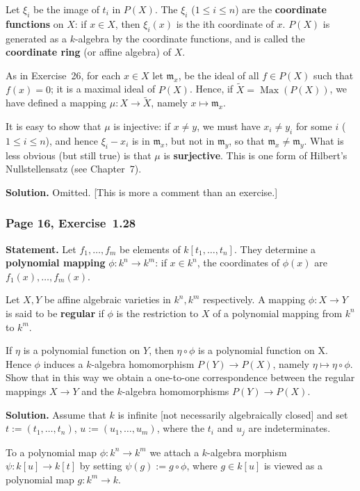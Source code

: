 \documentclass[12pt,letterpaper]{article}%
\newcommand{\oo}{\operatorname}\newcommand{\ooo}{\operatorname*}
\newcommand{\mf}{\mathfrak}
\newcommand{\mmm}{\mf m}
\newcommand{\nn}{\noindent}
\begin{document}
Let $\xi_i$ be the image of $t_i$ in $P(X)$. The $\xi_i$ ($1\le i\le n$) are the \textbf{coordinate functions} on $X$: if $x\in X$, then $\xi_i(x)$ is the ith coordinate of $x$. $P(X)$ is generated as a $k$-algebra by the coordinate functions, and is called the \textbf{coordinate ring} (or affine algebra) of $X$.

As in Exercise~26, for each $x\in X$ let $\mmm_x$, be the ideal of all $f\in P(X)$ such that $f(x)=0$; it is a maximal ideal of $P(X)$. Hence, if $\widetilde X=\oo{Max}(P(X))$, we have defined a mapping $\mu:X\to\widetilde X$, namely $x\mapsto\mmm_x$.

It is easy to show that $\mu$ is injective: if $x\ne y$, we must have $x_i\ne y_i$ for some $i$ ($1\le i\le n$), and hence $\xi_i-x_i$ is in $\mmm_x$, but not in $\mmm_y$, so that $\mmm_x\ne\mmm_y$. What is less obvious (but still true) is that $\mu$ is \textbf{surjective}. This is one form of Hilbert's Nullstellensatz (see Chapter~7).

\nn\textbf{Solution.} Omitted. [This is more a comment than an exercise.]

\subsubsection{Page 16, Exercise~1.28}%

\textbf{Statement.} Let $f_1,\ldots,f_m$ be elements of $k[t_1,\ldots,t_n]$. They determine a \textbf{polynomial mapping} $\phi:k^n\to k^m$: if $x\in k^n$, the coordinates of $\phi(x)$ are $f_1(x),\ldots,f_m(x)$.

Let $X,Y$ be affine algebraic varieties in $k^n,k^m$ respectively. A mapping $\phi:X\to Y$ is said to be \textbf{regular} if $\phi$ is the restriction to $X$ of a polynomial mapping from $k^n$ to $k^m$.

If $\eta$ is a polynomial function on $Y$, then $\eta\circ\phi$ is a polynomial function on X. Hence $\phi$ induces a $k$-algebra homomorphism $P(Y)\to P(X)$, namely $\eta\mapsto\eta\circ\phi$. Show that in this way we obtain a one-to-one correspondence between the regular mappings $X\to Y$ and the $k$-algebra homomorphisms $P(Y)\to P(X)$.

\nn\textbf{Solution.} Assume that $k$ is infinite [not necessarily algebraically closed] and set $t:=(t_1,\dots,t_n)$, $u:=(u_1,\dots,u_m)$, where the $t_i$ and $u_j$ are indeterminates. 

To a polynomial map $\phi:k^n\to k^m$ we attach a $k$-algebra morphism $\psi:k[u]\to k[t]$ by setting $\psi(g):=g\circ\phi$, where $g\in k[u]$ is viewed as a polynomial map $g:k^m\to k$. 
\end{document}
